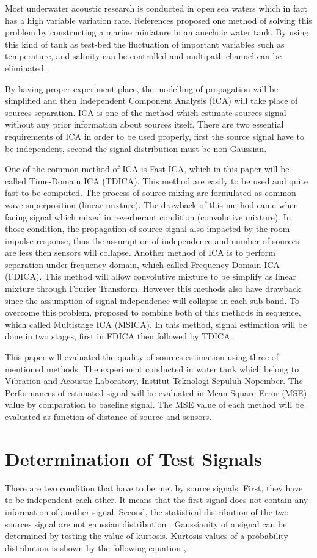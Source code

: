 \documentclass[a4paper]{jpconf}
\begin{document}
Most underwater acoustic research is conducted in open sea waters which in fact has a high variable variation rate. References \cite{1} proposed one method of solving this problem by constructing a marine miniature in an anechoic water tank. By using this kind of tank as test-bed the fluctuation of important variables such as temperature, and salinity can be controlled and multipath channel can be eliminated. 

By having proper experiment place, the modelling of propagation will be simplified and then Independent Component Analysis (ICA) will take place of sources separation. ICA is one of the method which estimate sources signal without any prior information about sources itself. There are two essential requirements of ICA in order to be used properly, first the source signal have to be independent, second the signal distribution must be non-Gaussian.

One of the common method of ICA is Fast ICA, which in this paper will be called Time-Domain ICA (TDICA). This method are easily to be used and quite fast to be computed. The process of source mixing are formulated as common wave superposition (linear mixture). The drawback of this method came when facing signal which mixed in reverberant condition (convolutive mixture). In those condition, the propagation of source signal also impacted by the room impulse response, thus the assumption of independence and number of sources are less then sensors will collapse. Another method of ICA is to perform separation under frequency domain, which called Frequency Domain ICA (FDICA). This method will allow convolutive mixture to be simplify as linear mixture through Fourier Transform. However this methods also have drawback since the assumption of signal independence will collapse in each sub band. To overcome this problem, \cite{2} proposed to combine both of this methods in sequence, which called Multistage ICA (MSICA). In this method, signal estimation will be done in two stages, first in FDICA then followed by TDICA. 

This paper will evaluated the quality of sources estimation using three of mentioned methods. The experiment conducted in water tank which belong to Vibration and Acoustic Laboratory, Institut Teknologi Sepuluh Nopember. The Performances of estimated signal will be evaluated in Mean Square Error (MSE) value by comparation to baseline signal. The MSE value of each method will be evaluated as function of distance of source and sensors.

\section{Determination of Test Signals}
There are two condition that have to be met by source signals. First, they have to be independent each other. It means that the first signal does not contain any information of another signal. Second, the statistical distribution of the two sources signal are not gaussian distribution \cite{3}. Gaussianity of a signal can be determined by testing the value of kurtosis. Kurtosis values ​​of a probability distribution is shown by the following equation \cite{4},
\end{document}
